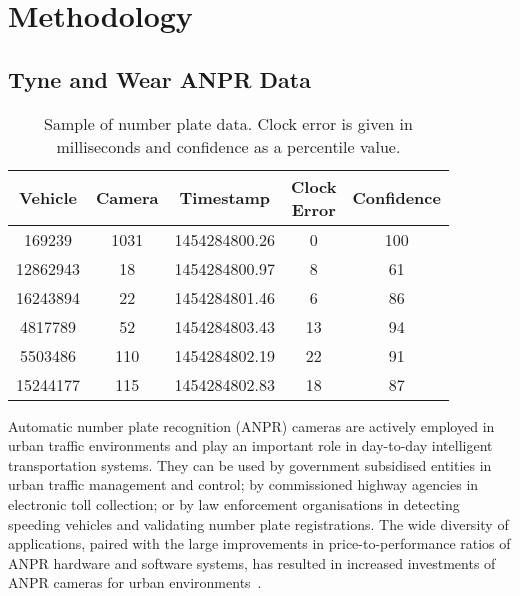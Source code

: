 \section{Methodology}
\subsection{Tyne and Wear ANPR Data}\label{s.ncl}

\begin{table}[!ht]
\centering
\tabcolsep=0.17cm
\small
\begin{tabular}{c c c c c}
  \hline
  Vehicle & Camera & Timestamp & \thead{Clock \\Error} & Confidence \\
  \hline
  169239 & 1031 & 1454284800.26 &   0 & 100 \\
  12862943 & 18 & 1454284800.97 &   8 &  61 \\
  16243894 & 22 & 1454284801.46 &   6 &  86 \\
  4817789 & 52 & 1454284803.43 &  13 &  94 \\
  5503486 & 110 & 1454284802.19 &  22 &  91 \\
  15244177 & 115 & 1454284802.83 &  18 &  87 \\
   \hline
\end{tabular}
\caption{Sample of number plate data. Clock error is given in milliseconds and confidence as a percentile value.}
\label{t:np_data_example}
\end{table}

Automatic num\-ber plate recognition (ANPR) cameras are actively employed in urban traffic environments and play an important role in day-to-day intelligent transportation systems. They can be used by government subsidised entities in urban traffic management and control; by commissioned highway agencies in electronic toll collection; or by law enforcement organisations in detecting speeding vehicles and validating number plate registrations. The wide diversity of applications, paired with the large improvements in price-to-performance ratios of ANPR hardware and software systems, has resulted in increased investments of ANPR cameras for urban environments~\cite{EvolutionUTMC2013, SurveyITS2011}.

